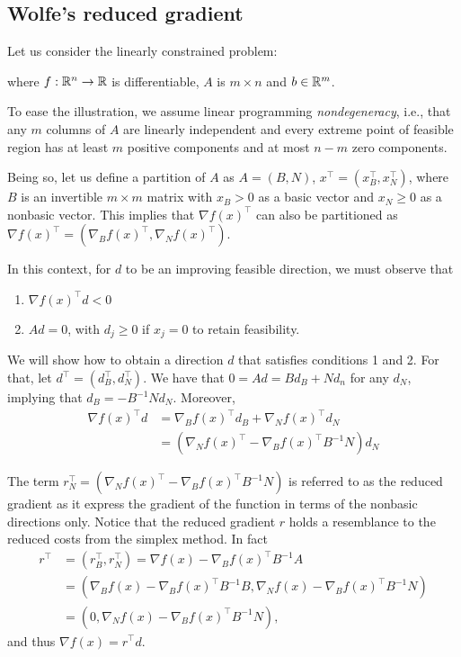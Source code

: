 \subsection{Wolfe's reduced gradient}

Let us consider the linearly constrained problem:
where $f : \mathbb{R}^n \rightarrow \mathbb{R}$ is differentiable, $A$ is $m \times n$ and $b \in \mathbb{R}^m$.

To ease the illustration, we assume linear programming \emph{nondegeneracy}, i.e., that any $m$ columns of $A$ are linearly independent and every extreme point of feasible region has at least $m$ positive components and at most $n-m$ zero components.

Being so, let us define a partition of $A$ as $A = (B, N)$, $x^\top = (x_B^\top, x_N^\top)$, where $B$ is an invertible $m \times m$ matrix with $x_B > 0$ as a basic vector and $x_N \geq 0$ as a nonbasic vector. This implies that $\nabla f(x)^\top$ can also be partitioned as $\nabla f(x)^\top= (\nabla_Bf (x)^\top, \nabla_Nf(x)^\top)$.

In this context, for $d$ to be an improving feasible direction, we must observe that
\begin{enumerate}
	\item $\nabla f(x)^\top d < 0$
	\item $Ad = 0$, with $d_j \geq 0$ if $x_j = 0$ to retain feasibility.  
\end{enumerate}

We will show how to obtain a direction $d$ that satisfies conditions 1 and 2. For that, let $d^\top = (d_B^\top, d_N^\top)$. We have that $0 = Ad = Bd_B + Nd_n$ for any $d_N$, implying that $d_B = -B^{-1}Nd_N$. Moreover,
\begin{align}
	\nabla f(x)^\top d & = \nabla_B f(x)^\top d_B + \nabla_N f(x)^\top d_N \nonumber\\
	& = (\nabla_N f(x)^\top - \nabla_Bf(x)^\top B^{-1}N)d_N \label{eq:red_grad}
\end{align}

The term $r_N^\top = (\nabla_N f(x)^\top - \nabla_Bf(x)^\top B^{-1}N)$ is referred to as the reduced gradient as it express the gradient of the function in terms of the nonbasic directions only. Notice that the reduced gradient $r$ holds a resemblance to the reduced costs from the simplex method. In fact
%
\begin{align*}
	r^\top & =  (r_B^\top, r_N^\top) = \nabla f(x) - \nabla_Bf(x)^\top B^{-1}A \\ 
 	& =  (\nabla_B f(x) - \nabla_B f(x)^\top B^{-1}B, \nabla_N f(x) - \nabla_B f(x)^\top B^{-1}N) \\
 	& = (0, \nabla_N f(x) - \nabla_B f(x)^\top B^{-1}N),
\end{align*}
%
and thus $\nabla f(x) = r^\top d$.

